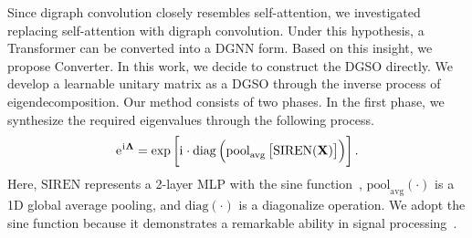Since digraph convolution closely resembles self-attention, we investigated replacing self-attention with digraph convolution. Under this hypothesis, a Transformer can be converted into a DGNN form. Based on this insight, we propose Converter. In this work, we decide to construct the DGSO directly. We develop a learnable unitary matrix as a DGSO through the inverse process of eigendecomposition. Our method consists of two phases. In the first phase, we synthesize the required eigenvalues through the following process.
\begin{equation}\label{eq:eigenvalue_gap}
\centering
\eu^{\ramuno\mathbf{\Lambda}}
= \exp\left[\ramuno\cdot\mathrm{diag}\left(\mathrm{pool}_{\text{avg}}\left[\mathrm{SIREN}(\mathbf{X})\right]\right)\right].
\end{equation}
Here, $\mathrm{SIREN}$ represents a 2-layer MLP with the sine function~\citep{NEURIPS2020_53c04118}, $\mathrm{pool}_{\text{avg}}(\cdot)$ is a 1D global average pooling, and $\mathrm{diag}(\cdot)$ is a diagonalize operation. We adopt the sine function because it demonstrates a remarkable ability in signal processing~\citep{NEURIPS2020_53c04118}.

